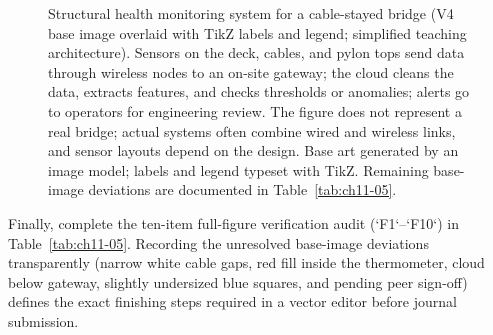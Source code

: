 \begin{figure}[htbp]
\caption{Structural health monitoring system for a cable-stayed bridge (V4 base image overlaid with TikZ labels and legend; simplified teaching architecture). Sensors on the deck, cables, and pylon tops send data through wireless nodes to an on-site gateway; the cloud cleans the data, extracts features, and checks thresholds or anomalies; alerts go to operators for engineering review. The figure does not represent a real bridge; actual systems often combine wired and wireless links, and sensor layouts depend on the design. Base art generated by an image model; labels and legend typeset with TikZ. Remaining base-image deviations are documented in Table~\ref{tab:ch11-05}.}\label{fig:ch11-06}
\end{figure}

Finally, complete the ten-item full-figure verification audit (`F1`--`F10`) in Table~\ref{tab:ch11-05}. Recording the unresolved base-image deviations transparently (narrow white cable gaps, red fill inside the thermometer, cloud below gateway, slightly undersized blue squares, and pending peer sign-off) defines the exact finishing steps required in a vector editor before journal submission.

